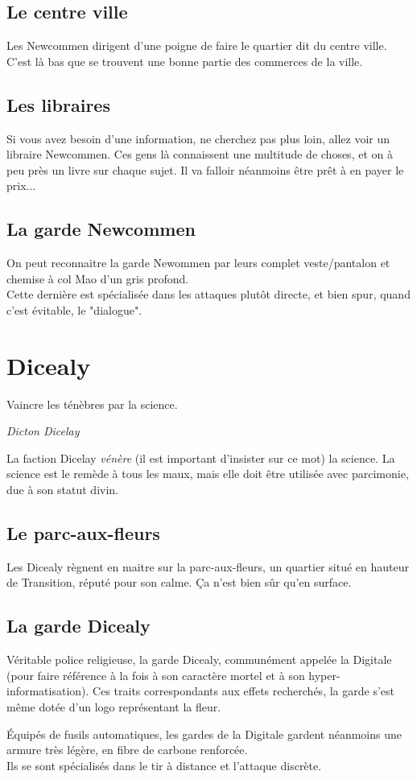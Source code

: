 \documentclass{book}
\begin{document}
\subsection{Le centre ville}
Les Newcommen dirigent d'une poigne de faire le quartier dit du centre ville. C'est là bas que se trouvent une bonne partie des commerces de la ville.

\subsection{Les libraires}
Si vous avez besoin d'une information, ne cherchez pas plus loin, allez voir un libraire Newcommen. Ces gens là connaissent une multitude de choses, et on à peu près un livre sur chaque sujet. Il va falloir néanmoins être prêt à en payer le prix...

\subsection{La garde Newcommen}
On peut reconnaitre la garde Newommen par leurs complet veste/pantalon et chemise à col Mao d'un gris profond.
\\
Cette dernière est spécialisée dans les attaques plutôt directe, et bien spur, quand c'est évitable, le "dialogue".

\section{Dicealy}
\epigraph{Vaincre les ténèbres par la science.}{\textit{Dicton Dicelay}}
La faction Dicelay \emph{vénère} (il est important d'insister sur ce mot) la science. La science est le remède à tous les maux, mais elle doit être utilisée avec parcimonie, due à son statut divin.

\subsection{Le parc-aux-fleurs}
Les Dicealy règnent en maitre sur la parc-aux-fleurs, un quartier situé en hauteur de Transition, réputé pour son calme. Ça n'est bien sûr qu'en surface.

\subsection{La garde Dicealy}
Véritable police religieuse, la garde Dicealy, communément appelée la Digitale (pour faire référence à la fois à son caractère mortel et à son hyper-informatisation).
Ces traits correspondants aux effets recherchés, la garde s'est même dotée d'un logo représentant la fleur.\\
\begin{figure}
    \centering
    \def\svgwidth{15em}
    
\end{figure}
Équipés de fusils automatiques, les gardes de la Digitale gardent néanmoins une armure très légère, en fibre de carbone renforcée.
\\
Ils se sont spécialisés dans le tir à distance et l'attaque discrète.
\end{document}
